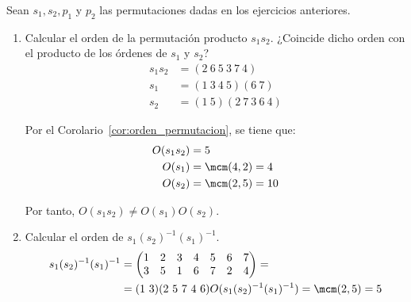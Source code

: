 \begin{ejercicio}\label{ej:2.17}
    Sean $s_1, s_2, p_1$ y $p_2$ las permutaciones dadas en los ejercicios anteriores.
    \begin{enumerate}
        \item Calcular el orden de la permutación producto $s_1s_2$. ¿Coincide dicho orden con el producto de los órdenes de $s_1$ y $s_2$?
        \begin{align*}
            s_1s_2 &= (2\ 6\ 5\ 3\ 7\ 4)\\
            s_1 &= (1\ 3\ 4\ 5)(6\ 7)\\
            s_2 &= (1\ 5)(2\ 7\ 3\ 6\ 4)
        \end{align*}

        Por el Corolario~\ref{cor:orden_permutacion}, se tiene que:
        \begin{align*}
            O(s_1s_2) &= 5\\
            O(s_1) &= \mcm(4, 2) = 4\\
            O(s_2) &= \mcm(2, 5) = 10
        \end{align*}

        Por tanto, $O(s_1s_2) \neq O(s_1)O(s_2)$.
        
        \item Calcular el orden de $s_1(s_2)^{-1}(s_1)^{-1}$.
        \begin{align*}
            s_1(s_2)^{-1}(s_1)^{-1}
            &=\begin{pmatrix}
                1 & 2 & 3 & 4 & 5 & 6 & 7 \\
                3 & 5 & 1 & 6 & 7 & 2 & 4
            \end{pmatrix}
            =\\&= (1\ 3)(2\ 5\ 7\ 4\ 6)
            O(s_1(s_2)^{-1}(s_1)^{-1}) = \mcm(2, 5) = 5
        \end{align*}


\end{enumerate}
\end{ejercicio}
